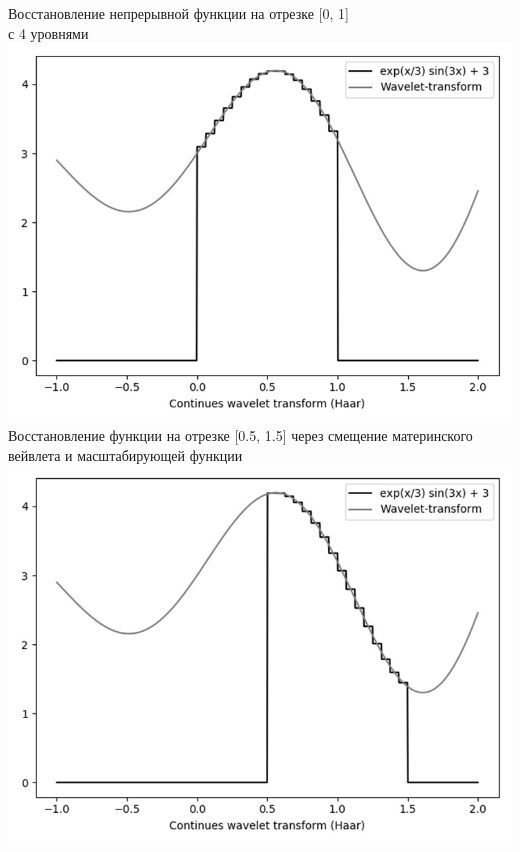 \documentclass[a4paper]{article}
\begin{document}
	\begin{minipage}{0.45\textwidth}
		\begin{center}
			Восстановление непрерывной функции на отрезке [0, 1] \\ с 4 уровнями
			\includegraphics[scale=0.25]{./img2_1.jpg}
			Восстановление функции на отрезке [0.5, 1.5] через смещение материнского вейвлета и масштабирующей функции
			\includegraphics[scale=0.25]{./img2_3.jpg}
		\end{center}
	\end{minipage}
	\hfill
\end{document}
